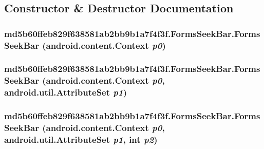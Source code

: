 \subsection{Constructor \& Destructor Documentation}
\hypertarget{classmd5b60ffeb829f638581ab2bb9b1a7f4f3f_1_1_forms_seek_bar_702512b58f3e4e250bf52ad5c064f83a}{
\subsubsection[{FormsSeekBar}]{\setlength{\rightskip}{0pt plus 5cm}md5b60ffeb829f638581ab2bb9b1a7f4f3f.FormsSeekBar.FormsSeekBar (android.content.Context {\em p0})}}
\label{classmd5b60ffeb829f638581ab2bb9b1a7f4f3f_1_1_forms_seek_bar_702512b58f3e4e250bf52ad5c064f83a}


\hypertarget{classmd5b60ffeb829f638581ab2bb9b1a7f4f3f_1_1_forms_seek_bar_2fed7f17c8acbe1d59dd917b841b8a23}{
\subsubsection[{FormsSeekBar}]{\setlength{\rightskip}{0pt plus 5cm}md5b60ffeb829f638581ab2bb9b1a7f4f3f.FormsSeekBar.FormsSeekBar (android.content.Context {\em p0}, \/  android.util.AttributeSet {\em p1})}}
\label{classmd5b60ffeb829f638581ab2bb9b1a7f4f3f_1_1_forms_seek_bar_2fed7f17c8acbe1d59dd917b841b8a23}


\hypertarget{classmd5b60ffeb829f638581ab2bb9b1a7f4f3f_1_1_forms_seek_bar_2c2467e8fb04433f1c7a2333d4893891}{
\subsubsection[{FormsSeekBar}]{\setlength{\rightskip}{0pt plus 5cm}md5b60ffeb829f638581ab2bb9b1a7f4f3f.FormsSeekBar.FormsSeekBar (android.content.Context {\em p0}, \/  android.util.AttributeSet {\em p1}, \/  int {\em p2})}}
\label{classmd5b60ffeb829f638581ab2bb9b1a7f4f3f_1_1_forms_seek_bar_2c2467e8fb04433f1c7a2333d4893891}


